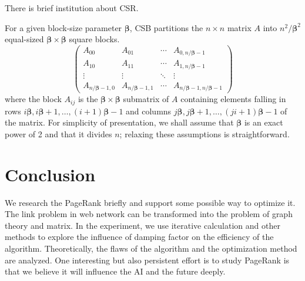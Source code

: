 \documentclass[lettersize,journal,12pt,conference]{IEEEtran}
\begin{document}
There is brief institution about CSR.


For a given block-size parameter $\boldsymbol{\beta}$, CSB partitions the $n\times n$
matrix $A$ into $n^2/\boldsymbol{\beta}^2$ equal-sized $\boldsymbol{\beta} \times \boldsymbol{\beta}$ square blocks.
\begin{equation}
	\begin{pmatrix}
		A_{00}                       & A_{01}                       & \cdots & A_{0,n/\boldsymbol{\beta}-1}                      \\
		A_{10}                       & A_{11}                       & \cdots & A_{1,n/\boldsymbol{\beta}-1}                      \\
		\vdots                       & \vdots                       & \ddots & \vdots                                            \\
		A_{n/\boldsymbol{\beta}-1,0} & A_{n/\boldsymbol{\beta}-1,1} & \cdots & A_{n/\boldsymbol{\beta}-1,n/\boldsymbol{\beta}-1}
	\end{pmatrix}
\end{equation}
where the block $A_{ij}$ is the $\boldsymbol{\beta} \times \boldsymbol{\beta}$ submatrix of $A$ containing elements falling in rows $i\boldsymbol{\beta}, i\boldsymbol{\beta}+1, \ldots, (i+1)\boldsymbol{\beta}-1$ and columns
$j\boldsymbol{\beta}, j\boldsymbol{\beta}+1, \ldots, (ji+1)\boldsymbol{\beta}-1$ of the matrix. For simplicity of presentation,
we shall assume that $\boldsymbol{\beta} $ is an exact power of 2 and that it divides $n$;
relaxing these assumptions is straightforward.

\section{Conclusion}

We research the PageRank briefly and support some possible way to optimize it. The link problem in web network can be transformed into the problem of graph theory and matrix. In the experiment, we use iterative calculation and other methods to explore the influence of damping factor on the efficiency of the algorithm. Theoretically, the flaws of the algorithm and the optimization method are analyzed. One interesting but also persistent effort
is to study PageRank is that we believe it will influence the AI and the future deeply.
\end{document}
